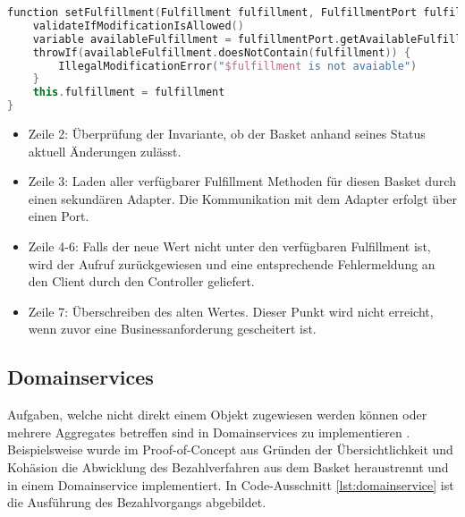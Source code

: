 \begin{minipage}{\linewidth} %
	\begin{lstlisting}[caption={Setzen der Fulfillment Methode im Basket Aggregate}, label={lst:basket}, language=Kotlin]
function setFulfillment(Fulfillment fulfillment, FulfillmentPort fulfillmentPort) {
	validateIfModificationIsAllowed()
	variable availableFulfillment = fulfillmentPort.getAvailableFulfillment(outletID)
	throwIf(availableFulfillment.doesNotContain(fulfillment)) {
		IllegalModificationError("$fulfillment is not avaiable")
	}
	this.fulfillment = fulfillment
}
	\end{lstlisting}


	\begin{itemize}[noitemsep,nolistsep]
		\item Zeile 2: Überprüfung der Invariante, ob der Basket anhand seines Status aktuell Änderungen zulässt.
		\item Zeile 3: Laden aller verfügbarer Fulfillment Methoden für diesen Basket durch einen sekundären Adapter. Die Kommunikation mit dem Adapter erfolgt über einen Port.
		\item Zeile 4-6: Falls der neue Wert nicht unter den verfügbaren Fulfillment ist, wird der Aufruf zurückgewiesen und eine entsprechende Fehlermeldung an den Client durch den Controller geliefert.
		\item Zeile 7: Überschreiben des alten Wertes. Dieser Punkt wird nicht erreicht, wenn zuvor eine Businessanforderung gescheitert ist.
	\end{itemize}
\end{minipage}

\subsection{Domainservices}

Aufgaben, welche nicht direkt einem Objekt zugewiesen werden können oder mehrere Aggregates betreffen sind in Domainservices zu implementieren \cite[S. 267]{Vernon.2015}. Beispielsweise wurde im Proof-of-Concept aus Gründen der Übersichtlichkeit und Kohäsion die Abwicklung des Bezahlverfahren aus dem Basket heraustrennt und in einem Domainservice implementiert. In Code-Ausschnitt \ref{lst:domainservice} ist die Ausführung des Bezahlvorgangs abgebildet. 

